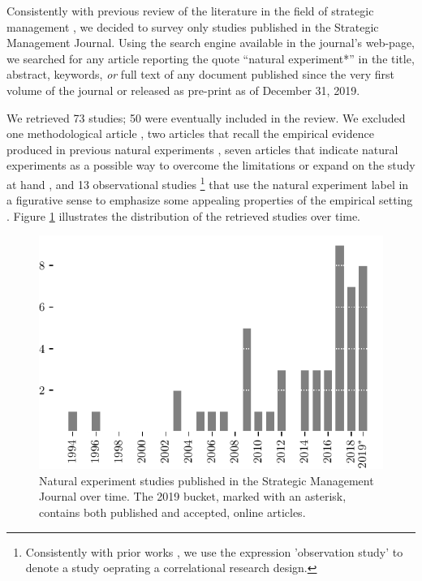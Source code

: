 \documentclass[nobib]{tufte-handout}
\begin{document}
\begin{refsection}

\noindent  Consistently with previous review of the literature in the field of
strategic management \parencite[e.g.][]{Haans2015}, we decided to survey only
studies published in the Strategic Management Journal.  Using the search engine
available in the journal's web-page, we searched for any article reporting the
quote ``natural experiment*'' in the title, abstract, keywords, \emph{or} full
text of any document published since the very first volume of the journal or
released as pre-print as of December 31, 2019.

We retrieved 73 studies; 50 were eventually included in the review. We excluded
one methodological article \parencite[][]{Semadeni2014}, two articles that
recall the empirical evidence produced in previous natural experiments
\parencite[][]{Gallus2016,Chakrabarti2015}, seven articles that indicate natural
experiments as a possible way to overcome the limitations or expand on the study
at hand \parencite[e.g.][]{Karim2012}, and 13 observational studies
\footnote{Consistently with prior works \parencite[][]{Dunning2012,Sieweke2019},
we use the expression 'observation study' to denote a study oeprating a
correlational research design.} that use the natural experiment label in a
figurative sense to emphasize some appealing properties of the empirical setting
\parencite[][]{Grigoriou2017}. Figure \ref{fig:studies_over_time} illustrates
the distribution of the retrieved studies over time.

\begin{figure}[]
    \centering
    \includegraphics{images/studies_over_time.pdf}
    \caption{Natural experiment studies published in the Strategic Management
        Journal over time. The 2019 bucket, marked with an asterisk, contains 
        both published and accepted, online articles.}
    \label{fig:studies_over_time}
\end{figure}


\end{refsection}
\end{document}

